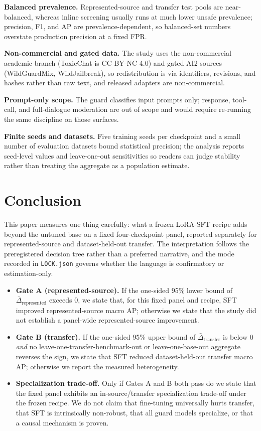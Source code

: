 \documentclass[sigconf,nonacm]{acmart}
\begin{document}
\textbf{Balanced prevalence.} Represented-source and transfer test pools are near-balanced, whereas inline screening usually runs at much lower unsafe prevalence; precision, F1, and AP are prevalence-dependent, so balanced-set numbers overstate production precision at a fixed FPR.

\textbf{Non-commercial and gated data.} The study uses the non-commercial academic branch (ToxicChat is CC BY-NC 4.0) and gated AI2 sources (WildGuardMix, WildJailbreak), so redistribution is via identifiers, revisions, and hashes rather than raw text, and released adapters are non-commercial.

\textbf{Prompt-only scope.} The guard classifies input prompts only; response, tool-call, and full-dialogue moderation are out of scope and would require re-running the same discipline on those surfaces.

\textbf{Finite seeds and datasets.} Five training seeds per checkpoint and a small number of evaluation datasets bound statistical precision; the analysis reports seed-level values and leave-one-out sensitivities so readers can judge stability rather than treating the aggregate as a population estimate.

\section{Conclusion}
\label{sec:conclusion}

This paper measures one thing carefully: what a frozen LoRA-SFT recipe adds beyond the untuned base on a fixed four-checkpoint panel, reported separately for represented-source and dataset-held-out transfer. The interpretation follows the preregistered decision tree rather than a preferred narrative, and the mode recorded in \texttt{LOCK.json} governs whether the language is confirmatory or estimation-only.

\begin{itemize}
  \item \textbf{Gate A (represented-source).} If the one-sided 95\% lower bound of $\bar\Delta_{\text{represented}}$ exceeds 0, we state that, for this fixed panel and recipe, SFT improved represented-source macro AP; otherwise we state that the study did not establish a panel-wide represented-source improvement.
  \item \textbf{Gate B (transfer).} If the one-sided 95\% upper bound of $\bar\Delta_{\text{transfer}}$ is below 0 \emph{and} no leave-one-transfer-benchmark-out or leave-one-base-out aggregate reverses the sign, we state that SFT reduced dataset-held-out transfer macro AP; otherwise we report the measured heterogeneity.
  \item \textbf{Specialization trade-off.} Only if Gates A and B both pass do we state that the fixed panel exhibits an in-source/transfer specialization trade-off under the frozen recipe. We do not claim that fine-tuning universally hurts transfer, that SFT is intrinsically non-robust, that all guard models specialize, or that a causal mechanism is proven.
\end{itemize}
\end{document}
